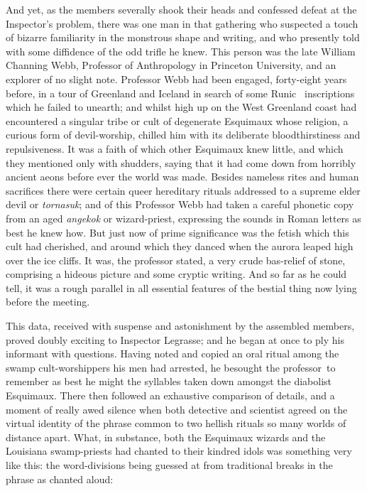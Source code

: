 And yet, as the members severally shook their heads and confessed defeat
at the Inspector's problem, there was one man in that gathering who
suspected a touch of bizarre familiarity in the monstrous shape and
writing, and who presently told with some diffidence of the odd trifle
he knew. This person was the late William Channing Webb, Professor of
Anthropology in Princeton University, and an explorer of no slight note.
Professor Webb had been engaged, forty-eight years before, in a tour of
Greenland and Iceland in search of some Runic \est\ inscriptions which he
failed to unearth; and whilst high up on the West Greenland coast had
encountered a singular tribe or cult of degenerate Esquimaux whose
religion, a curious form of devil-worship, chilled him with its
deliberate bloodthirstiness and repulsiveness. It was a faith of which
other Esquimaux knew little, and which they mentioned only with
shudders, saying that it had come down from horribly ancient aeons
before ever the world was made. Besides nameless rites and human
sacrifices there were certain queer hereditary rituals addressed to a
supreme elder devil or \emph{tornasuk}; and of this Professor Webb had taken a
careful phonetic copy from an aged \emph{angekok} or wizard-priest, expressing
the sounds in Roman letters as best he knew how. But just now of prime
significance was the fetish which this cult had cherished, and around
which they danced when the aurora leaped high over the ice cliffs. It
was, the professor stated, a very crude bas-relief of stone, comprising
a hideous picture and some cryptic writing. And so far as he could tell,
it was a rough parallel in all essential features of the bestial thing
now lying before the meeting.

This data, received with suspense and astonishment by the assembled
members, proved doubly exciting to Inspector Legrasse; and he began at
once to ply his informant with questions. Having noted and copied an
oral ritual among the swamp cult-worshippers his men had arrested, he
besought the professor\est\ to remember as best he might the syllables taken
down amongst the diabolist Esquimaux. There then followed an exhaustive
comparison of details, and a moment of really awed silence when both
detective and scientist agreed on the virtual identity of the phrase
common to two hellish rituals so many worlds of distance apart. What, in
substance, both the Esquimaux wizards and the Louisiana swamp-priests
had chanted to their kindred idols was something very like this: the
word-divisions being guessed at from traditional breaks in the phrase as
chanted aloud:

